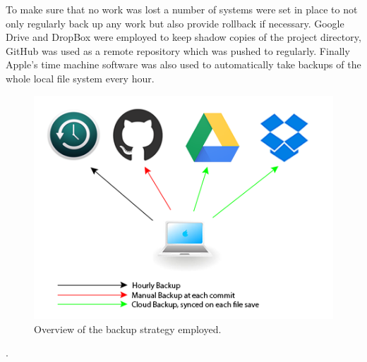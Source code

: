 \documentclass[12pt,twoside,notitlepage]{report}
\begin{document}
            To make sure that no work was lost a number of systems were set in place to not only regularly back up 
            any work but also provide rollback if necessary. Google Drive and DropBox were employed to keep shadow 
            copies of the project directory, GitHub was used as a remote repository which was pushed to regularly. 
            Finally Apple's time machine software was also used to automatically take backups of the whole local 
            file system every hour.

            \begin{figure}[H]
                \centering
                \includegraphics[scale=0.75]{backup_plan}
                \caption[Overview of the backup strategy employed.]{Overview of the backup strategy employed\footnotemark.}
            \end{figure}
            .






\cleardoublepage
\end{document}
